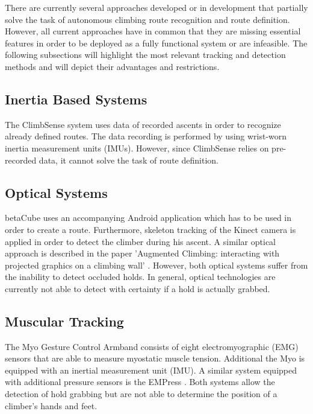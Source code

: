 There are currently several approaches developed or in development that partially solve the task of autonomous climbing route recognition and route definition.
However, all current approaches have in common that they are missing essential features in order to be deployed as a fully functional system or are infeasible. 
The following subsections will highlight the most relevant tracking and detection methods and will depict their advantages and restrictions. 

\subsection{Inertia Based Systems}
The ClimbSense system \cite{pub7648, Kosmalla:2015:CAC:2702123.2702311} uses data of recorded ascents in order to recognize already defined routes. 
The data recording is performed by using wrist-worn inertia measurement units (IMUs).
However, since ClimbSense relies on pre-recorded data, it cannot solve the task of route definition.


\subsection{Optical Systems}
betaCube \cite{pub8245, Wiehr:2016:BET:2851581.2892393} uses an accompanying Android application which has to be used in order to create a route. 
Furthermore, skeleton tracking of the Kinect camera is applied in order to detect the climber during his ascent.
A similar optical approach is described in the paper 'Augmented Climbing: interacting with projected graphics on a climbing wall' \cite{Kajastila:2014:ACI:2611780.2581139, Kajastila:2014:ACI:2559206.2581139}.
However, both optical systems suffer from the inability to detect occluded holds. 
In general, optical technologies are currently not able to detect with certainty if a hold is actually grabbed.

\subsection{Muscular Tracking}
The Myo Gesture Control Armband \cite{Myo:Online} consists of eight electromyographic (EMG) sensors that are able to measure myostatic muscle tension. 
Additional the Myo is equipped with an inertial measurement unit (IMU). 
A similar system equipped with additional pressure sensors is the EMPress \cite{McIntosh:2016:EPH:2858036.2858093}. 
Both systems allow the detection of hold grabbing but are not able to determine the position of a climber's hands and feet.

